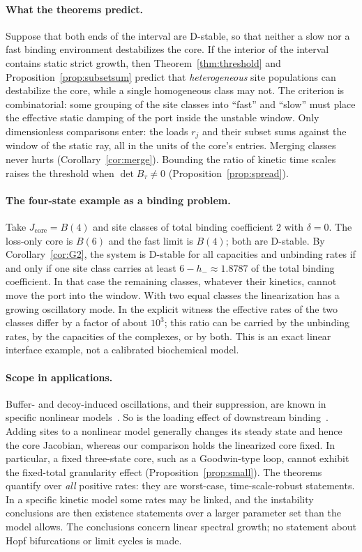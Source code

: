 \documentclass[11pt,a4paper]{article}
\theoremstyle{plain}
\theoremstyle{definition}
\theoremstyle{remark}
\begin{document}
\paragraph{What the theorems predict.}
Suppose that both ends of the interval are D-stable, so that neither a slow
nor a fast binding environment destabilizes the core. If the interior of the
interval contains static strict growth, then
Theorem~\ref{thm:threshold} and Proposition~\ref{prop:subsetsum} predict that
\emph{heterogeneous} site populations can destabilize the core, while a
single homogeneous class may not. The criterion is
combinatorial: some grouping of the site classes into ``fast'' and ``slow''
must place the effective static damping of the port inside the unstable
window. Only dimensionless comparisons enter: the loads $r_j$ and their
subset sums against the window of the static ray, all in the units of the
core's entries. Merging classes never hurts (Corollary~\ref{cor:merge}).
Bounding the ratio of kinetic time scales raises the threshold when
$\det B_\tau\ne0$ (Proposition~\ref{prop:spread}).

\paragraph{The four-state example as a binding problem.}
Take $J_{\mathrm{core}}=B(4)$ and site classes of total binding coefficient
$2$ with $\delta=0$. The loss-only core is $B(6)$ and the fast limit is
$B(4)$; both are D-stable. By Corollary~\ref{cor:G2}, the system is D-stable
for all capacities and unbinding rates if and only if one site class carries
at least $6-h_-\approx1.8787$ of the total binding coefficient. In that case
the remaining classes, whatever their kinetics, cannot move the port into the
window. With two equal classes the linearization has a growing oscillatory mode.
In the explicit witness the effective rates of the two classes differ by a
factor of about $10^3$; this ratio can be carried by the unbinding rates, by
the capacities of the complexes, or by both. This is an exact linear
interface example, not a calibrated biochemical model.

\paragraph{Scope in applications.}
Buffer- and decoy-induced oscillations, and their suppression, are known in
specific nonlinear models~\cite{falcke2003,gin2006,karapetyan2015,dey2021}. So
is the loading effect of downstream binding~\cite{delvecchio2008,jayanthi2013}.
Adding sites to a nonlinear model generally changes its steady state and hence
the core Jacobian, whereas our comparison holds the linearized core fixed. In
particular, a fixed three-state core, such as a Goodwin-type loop, cannot
exhibit the fixed-total granularity effect (Proposition~\ref{prop:small}).
The theorems quantify over \emph{all} positive rates: they are worst-case,
time-scale-robust statements. In a specific kinetic model some rates may be
linked, and the instability conclusions are then existence statements over a
larger parameter set than the model allows. The conclusions concern linear
spectral growth; no statement about Hopf bifurcations or limit cycles is made.
\end{document}
